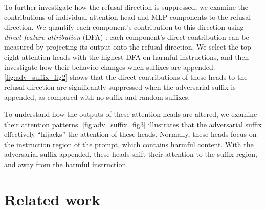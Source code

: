 \documentclass{article}
\begin{document}
To further investigate how the refusal direction is suppressed, we examine the contributions of individual attention head and MLP components to the refusal direction.
We quantify each component's contribution to this direction using \emph{direct feature attribution} (DFA) \citep{makelov2024towards, attention_saes}: each component's direct contribution can be measured by projecting its output onto the refusal direction.
We select the top eight attention heads with the highest DFA on harmful instructions, and then investigate how their behavior changes when suffixes are appended.
\autoref{fig:adv_suffix_fig2} shows that the direct contributions of these heads to the refusal direction are significantly suppressed when the adversarial suffix is appended, as compared with no suffix and random suffixes.

To understand how the outputs of these attention heads are altered, we examine their attention patterns.
\autoref{fig:adv_suffix_fig3} illustrates that the adversarial suffix effectively ``hijacks'' the attention of these heads. Normally, these heads focus on the instruction region of the prompt, which contains harmful content. With the adversarial suffix appended, these heads shift their attention to the suffix region, and away from the harmful instruction.

\section{Related work}
\end{document}
